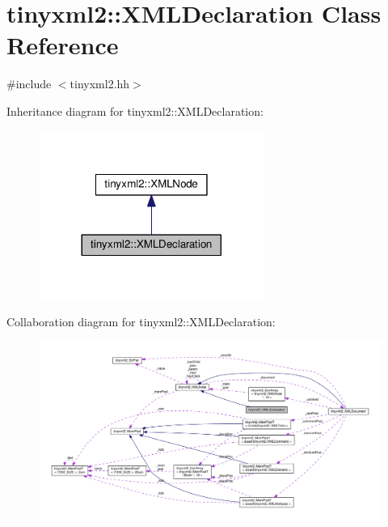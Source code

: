 \hypertarget{classtinyxml2_1_1XMLDeclaration}{}\section{tinyxml2\+:\+:X\+M\+L\+Declaration Class Reference}
\label{classtinyxml2_1_1XMLDeclaration}


{\ttfamily \#include $<$tinyxml2.\+hh$>$}



Inheritance diagram for tinyxml2\+:\+:X\+M\+L\+Declaration\+:
\nopagebreak
\begin{figure}[H]
\begin{center}
\leavevmode
\includegraphics[width=209pt]{classtinyxml2_1_1XMLDeclaration__inherit__graph}
\end{center}
\end{figure}


Collaboration diagram for tinyxml2\+:\+:X\+M\+L\+Declaration\+:
\nopagebreak
\begin{figure}[H]
\begin{center}
\leavevmode
\includegraphics[width=350pt]{classtinyxml2_1_1XMLDeclaration__coll__graph}
\end{center}
\end{figure}
